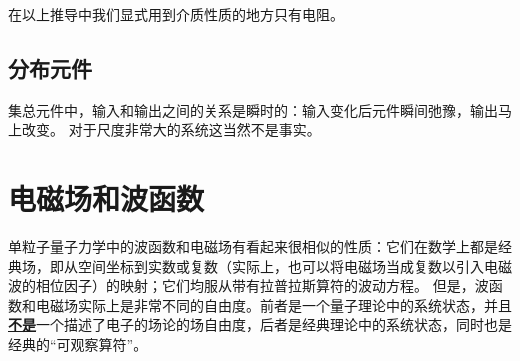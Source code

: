 \documentclass[UTF8, a4paper]{ctexart}
\newcommand*{\concept}[1]{\underline{\textbf{#1}}}
\begin{document}
在以上推导中我们显式用到介质性质的地方只有电阻。

\subsection{分布元件}

集总元件中，输入和输出之间的关系是瞬时的：输入变化后元件瞬间弛豫，输出马上改变。
对于尺度非常大的系统这当然不是事实。

\section{电磁场和波函数}

单粒子量子力学中的波函数和电磁场有看起来很相似的性质：它们在数学上都是经典场，即从空间坐标到实数或复数（实际上，也可以将电磁场当成复数以引入电磁波的相位因子）的映射；它们均服从带有拉普拉斯算符的波动方程。
但是，波函数和电磁场实际上是非常不同的自由度。前者是一个量子理论中的系统状态，并且\concept{不是}一个描述了电子的场论的场自由度，后者是经典理论中的系统状态，同时也是经典的“可观察算符”。
\end{document}
